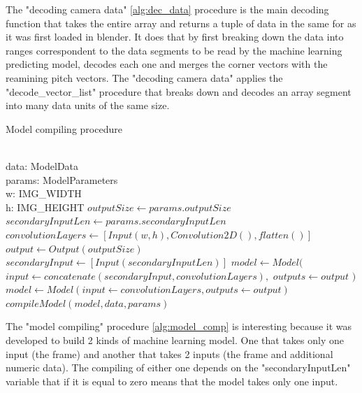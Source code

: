 \documentclass[
    11pt,
    oneside
]{report}
\begin{document}
The "decoding camera data" \ref{alg:dec_data} procedure is the main decoding function that takes the entire array and returns a tuple of data in the same for as it was first loaded in blender. It does that by first breaking down the data into ranges correspondent to the data segments to be read by the machine learning predicting model, decodes each one and merges the corner vectors with the reamining pitch vectors. The "decoding camera data" applies the "decode\_vector\_list" procedure that breaks down and decodes an array segment into many data units of the same size.


\begin{algorithm}[H]
\begin{algorithmic}
\caption{Model compiling procedure}\label{alg:model_comp}
\Require \\
    data: ModelData \\
    params: ModelParameters \\
    w: IMG\_WIDTH \\
    h: IMG\_HEIGHT
\State
\State $outputSize \gets params.outputSize$
\State $secondaryInputLen \gets params.secondaryInputLen$
\State $convolutionLayers \gets [Input(w, h), Convolution2D(), flatten()]$
\State $output \gets Output(outputSize)$
    \State $secondaryInput \gets [Input(secondaryInputLen)]$
    \State $model \gets Model($
        \State \indent $input \gets concatenate(secondaryInput, convolutionLayers),$
            \State \indent $outputs \gets output$
    \State $)$
\Else
    \State $model \gets Model(input \gets convolutionLayers, outputs \gets output)$
\EndIf
\State $compileModel(model, data, params)$
\end{algorithmic}
\end{algorithm}


The "model compiling" procedure \ref{alg:model_comp} is interesting because it was developed to build 2 kinds of machine learning model. One that takes only one input (the frame) and another that takes 2 inputs (the frame and additional numeric data). The compiling of either one depends on the "secondaryInputLen" variable that if it is equal to zero means that the model takes only one input.
\end{document}
